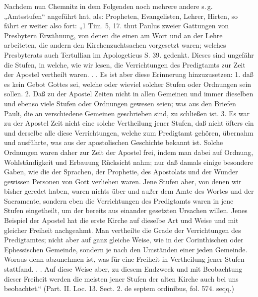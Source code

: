 Nachdem nun Chemnitz in dem Folgenden noch mehrere andere s.\,g. „Amtsstufen“ angeführt hat, als: Propheten, Evangelisten, Lehrer, Hirten, so fährt er weiter also fort: „1 Tim. 5, 17. thut Paulus zweier Gattungen von Presbytern Erwähnung, von denen die einen am Wort und an der Lehre arbeiteten, die andern den Kirchenzuchtsachen vorgesetzt waren; welches Presbyterats auch Tertullian im Apologeticus S. 39. gedenkt. Dieses sind ungefähr die Stufen, in welche, wie wir lesen, die Verrichtungen des Predigtamts zur Zeit der Apostel vertheilt waren. . . Es ist aber diese Erinnerung hinzuzusetzen: 1. daß es kein Gebot Gottes sei, welche oder wieviel solcher Stufen oder Ordnungen sein sollen. 2. Daß zu der Apostel Zeiten nicht in allen Gemeinen und immer dieselben und ebenso viele Stufen oder Ordnungen gewesen seien; was aus den Briefen Pauli, die an verschiedene Gemeinen geschrieben sind, zu schließen ist. 3. Es war zu der Apostel Zeit nicht eine solche Vertheilung jener Stufen, daß nicht öfters ein und derselbe alle diese Verrichtungen, welche zum Predigtamt gehören, übernahm und ausführte, was aus der apostolischen Geschichte bekannt ist. Solche Ordnungen waren daher zur Zeit der Apostel frei, indem man dabei auf Ordnung, Wohlständigkeit und Erbauung Rücksicht nahm; nur daß damals einige besondere Gaben, wie die der Sprachen, der Prophetie, des Apostolats und der Wunder gewissen Personen von Gott verliehen waren. Jene Stufen aber, von denen wir bisher geredet haben, waren nichts über und außer dem Amte des Wortes und der Sacramente, sondern eben die Verrichtungen des Predigtamts waren in jene Stufen eingetheilt, um der bereits aus einander gesetzten Ursachen willen. Jenes Beispiel der Apostel hat die erste Kirche auf dieselbe Art und Weise und mit gleicher Freiheit nachgeahmt. Man vertheilte die Grade der Verrichtungen des Predigtamtes; nicht aber auf ganz gleiche Weise, wie in der Corinthischen oder Ephessischen Gemeinde, sondern je nach den Umständen einer jeden Gemeinde. Woraus denn abzunehmen ist, was für eine Freiheit in Vertheilung jener Stufen stattfand. . . Auf diese Weise aber, zu diesem Endzweck und mit Beobachtung dieser Freiheit werden die meisten jener Stufen der alten Kirche auch bei uns beobachtet.“ (Part. II. Loc. 13. Sect. 2. de septem ordinibus, fol. 574. seqq.)


